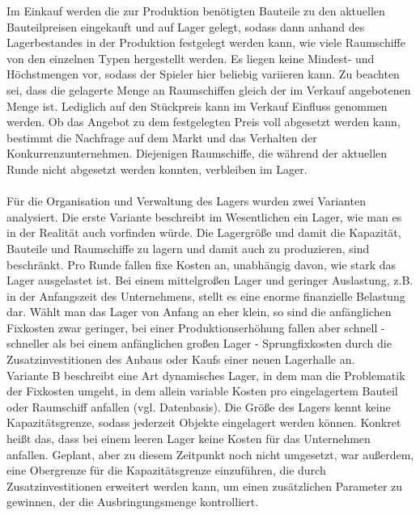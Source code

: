 Im Einkauf werden die zur Produktion benötigten Bauteile zu den aktuellen Bauteilpreisen eingekauft und auf Lager gelegt, sodass dann anhand des Lagerbestandes in der Produktion festgelegt werden kann, wie viele Raumschiffe von den einzelnen Typen hergestellt werden. Es liegen keine Mindest- und Höchstmengen vor, sodass der Spieler hier beliebig variieren kann. Zu beachten sei, dass die gelagerte Menge an Raumschiffen gleich der im Verkauf angebotenen Menge ist. Lediglich auf den Stückpreis kann im Verkauf Einfluss genommen werden. Ob das Angebot zu dem festgelegten Preis voll abgesetzt werden kann, bestimmt die Nachfrage auf dem Markt und das Verhalten der Konkurrenzunternehmen. Diejenigen Raumschiffe, die während der aktuellen Runde nicht abgesetzt werden konnten, verbleiben im Lager. 
\\
\\
Für die Organisation und Verwaltung des Lagers wurden zwei Varianten analysiert. Die erste Variante beschreibt im Wesentlichen  ein Lager, wie man es in der Realität auch vorfinden würde. Die Lagergröße und damit die Kapazität, Bauteile und Raumschiffe zu lagern und damit auch zu produzieren, sind beschränkt. Pro Runde fallen fixe Kosten an, unabhängig davon, wie stark das Lager ausgelastet ist. Bei einem mittelgroßen Lager und geringer Auslastung, z.B. in der Anfangszeit des Unternehmens, stellt es eine enorme finanzielle Belastung dar. Wählt man das Lager von Anfang an eher klein, so sind die anfänglichen Fixkosten zwar geringer, bei einer Produktionserhöhung fallen aber schnell - schneller als bei einem anfänglichen großen Lager - Sprungfixkosten durch die Zusatzinvestitionen des Anbaus oder Kaufs einer neuen Lagerhalle an. 
\\
Variante B beschreibt eine Art dynamisches Lager, in dem man die Problematik der Fixkosten umgeht, in dem allein variable Kosten pro eingelagertem Bauteil oder Raumschiff anfallen (vgl. Datenbasis). Die Größe des Lagers kennt keine Kapazitätsgrenze, sodass jederzeit Objekte eingelagert werden können. Konkret heißt das, dass bei einem leeren Lager keine Kosten für das Unternehmen anfallen. Geplant, aber zu diesem Zeitpunkt noch nicht umgesetzt, war außerdem, eine Obergrenze für die Kapazitätsgrenze einzuführen, die durch Zusatzinvestitionen erweitert werden kann, um einen zusätzlichen Parameter zu gewinnen, der die Ausbringungsmenge kontrolliert. 
\\
\\
